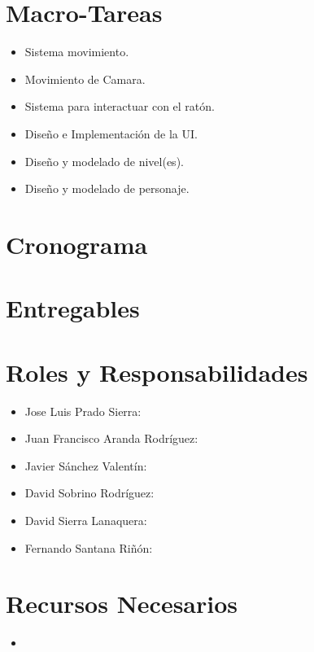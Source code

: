 \documentclass[12pt,twoside,letterpaper]{article}
\begin{document}



\newpage


\section{Macro-Tareas}
\begin{itemize}
    \item Sistema movimiento.
    \item Movimiento de Camara.
    \item Sistema para interactuar con el ratón.
    \item Diseño e Implementación de la UI.
    \item Diseño y modelado de nivel(es).
    \item Diseño y modelado de personaje.
\end{itemize}

\section{Cronograma}


\section{Entregables}


\section{Roles y Responsabilidades}
\begin{itemize}
    \item Jose Luis Prado Sierra:
    \item Juan Francisco Aranda Rodríguez:
    \item Javier Sánchez Valentín:
    \item David Sobrino Rodríguez:
    \item David Sierra Lanaquera:
    \item Fernando Santana Riñón:
\end{itemize}

\section{Recursos Necesarios}

\begin{itemize}
    \item 
\end{itemize}
\end{document}
